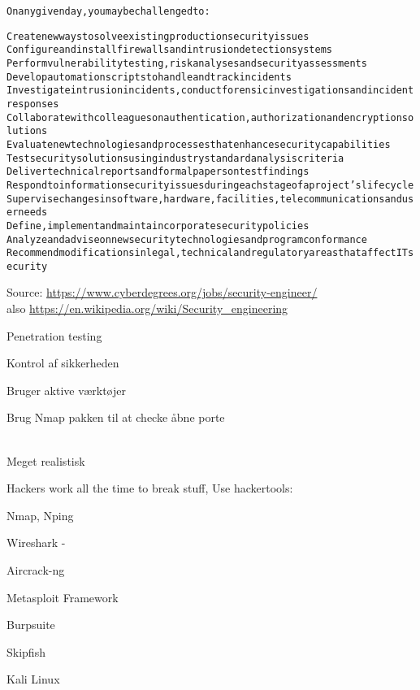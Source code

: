 \documentclass[20pt,landscape,a4paper,footrule]{foils}
\begin{document}
\begin{alltt}\small
On any given day, you may be challenged to:

	Create new ways to solve existing production security issues
	Configure and install firewalls and intrusion detection systems
	Perform vulnerability testing, risk analyses and security assessments
	Develop automation scripts to handle and track incidents
	Investigate intrusion incidents, conduct forensic investigations and incident responses
	Collaborate with colleagues on authentication, authorization and encryption solutions
	Evaluate new technologies and processes that enhance security capabilities
	Test security solutions using industry standard analysis criteria
	Deliver technical reports and formal papers on test findings
	Respond to information security issues during each stage of a project’s lifecycle
	Supervise changes in software, hardware, facilities, telecommunications and user needs
	Define, implement and maintain corporate security policies
	Analyze and advise on new security technologies and program conformance
	Recommend modifications in legal, technical and regulatory areas that affect IT security
\end{alltt}

Source: \url{https://www.cyberdegrees.org/jobs/security-engineer/}\\
also
\url{https://en.wikipedia.org/wiki/Security_engineering}


\begin{list1}
\item Penetration testing
\item Kontrol af sikkerheden
\item Bruger aktive værktøjer
\item Brug Nmap pakken til at checke åbne porte
\end{list1}



\\
Meget realistisk 




\begin{list2}
\item Hackers work all the time to break stuff, Use hackertools:
\item Nmap, Nping 
\item Wireshark - 
\item Aircrack-ng 
\item Metasploit Framework 
\item Burpsuite 
\item Skipfish 
\item Kali Linux 
\end{list2}
\end{document}
